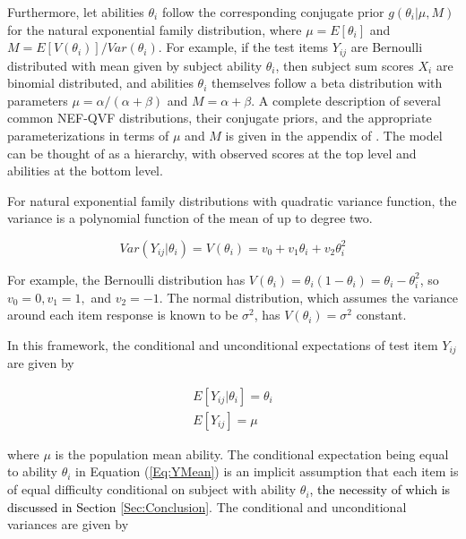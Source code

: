 \documentclass[12pt,epsfig]{article}
\newcommand{\changed}[1]{\textcolor{black}{#1}}
\newcommand{\testlength}{\changed{k}}%
\begin{document}
Furthermore, let abilities $\theta_i$  follow the corresponding conjugate prior $g(\theta_i | \mu, M)$ for the natural exponential family distribution, where $\mu = E[\theta_i]$ and $M = E[V(\theta_i)]/Var(\theta_i)$. For example, if the test items $Y_{ij}$ are Bernoulli distributed with mean given by subject ability $\theta_i$, then subject sum scores $X_i$ are binomial distributed, and abilities $\theta_i$ themselves follow a beta distribution with parameters $\mu = \alpha/(\alpha + \beta)$ and $M = \alpha + \beta$. A complete description of several common NEF-QVF distributions, their conjugate priors, and the appropriate parameterizations in terms of $\mu$ and $M$ is given in the appendix of \cite{Foster2020}. The model can be thought of as a hierarchy, with observed scores at the top level and abilities at the bottom level. %

For natural exponential family distributions with quadratic variance function, the variance is a polynomial function of the mean of up to degree two.

\begin{equation}
Var(Y_{ij} | \theta_i) = V(\theta_i) = v_0 + v_1 \theta_i + v_2 \theta_i^2 
\label{Eq:QVF}
\end{equation}

\noindent For example, the Bernoulli distribution has $V(\theta_i) = \theta_i (1 - \theta_i) = \theta_i - \theta_i^2$, so $v_0 = 0, v_1 = 1,$ and $v_2 = -1$. The normal distribution, which assumes the variance around each item response is known to be $\sigma^2$, has $V(\theta_i) = \sigma^2$ constant.

In this framework, the conditional and unconditional expectations of test item $Y_{ij}$ are given by

\begin{equation}
\begin{aligned}
E[Y_{ij} | \theta_i] = \theta_i  \\
E[Y_{ij}] = \mu  
\label{Eq:YMean}
\end{aligned}
\end{equation}

\noindent where $\mu$ is the population mean ability. The conditional expectation being equal to ability $\theta_i$ in Equation (\ref{Eq:YMean}) is an implicit assumption that each item is of equal difficulty conditional on subject with ability $\theta_i$\changed{, the necessity of which is discussed in Section \ref{Sec:Conclusion}}. The conditional and unconditional variances are given by
\end{document}
